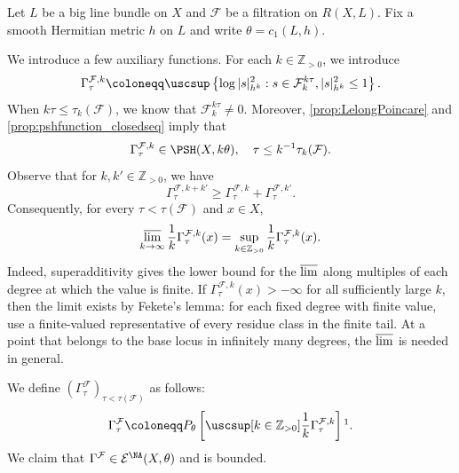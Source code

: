 \begin{example}\label{ex:RWN}
    Let $L$ be a big line bundle on $X$ and $\mathcal{F}$ be a filtration on $R(X,L)$. Fix a smooth Hermitian metric $h$ on $L$ and write $\theta=c_1(L,h)$.

    We introduce a few auxiliary functions. For each $k\in \mathbb{Z}_{>0}$, we introduce
    \[
    \Gamma^{\mathcal{F},k}_{\tau}\coloneqq \uscsup \left\{ \log |s|_{h^k}^2: s\in \mathcal{F}^{k\tau}_k, |s|_{h^k}^2\leq 1 \right\}.
    \]
    When $k\tau\leq \tau_k(\mathcal{F})$, we know that $\mathcal{F}_k^{k\tau}\neq 0$. Moreover, \cref{prop:LelongPoincare} and \cref{prop:pshfunction_closedseq} imply that
    \[
    \Gamma^{\mathcal{F},k}_{\tau}\in \PSH(X,k\theta),\quad \tau\leq k^{-1}\tau_k(\mathcal{F}).
    \]
    Observe that for $k,k'\in \mathbb{Z}_{>0}$, we have
    \[
    \Gamma^{\mathcal{F},k+k'}_{\tau}\geq \Gamma^{\mathcal{F},k}_{\tau}+\Gamma^{\mathcal{F},k'}_{\tau}.
    \]
    Consequently, for every $\tau<\tau(\mathcal F)$ and $x\in X$,
    \begin{equation}\label{eq:limkGammaFk}
    \varlimsup_{k\to\infty}\frac{1}{k}\Gamma^{\mathcal{F},k}_{\tau}(x)=\sup_{k\in \mathbb{Z}_{>0}}\frac{1}{k}\Gamma^{\mathcal{F},k}_{\tau}(x).
    \end{equation}
    Indeed, superadditivity gives the lower bound for the $\varlimsup$ along multiples of each degree at which the value is finite. If $\Gamma^{\mathcal{F},k}_{\tau}(x)>-\infty$ for all sufficiently large $k$, then the limit exists by Fekete's lemma: for each fixed degree with finite value, use a finite-valued representative of every residue class in the finite tail. At a point that belongs to the base locus in infinitely many degrees, the $\varlimsup$ is needed in general.

    We define $(\Gamma^{\mathcal{F}}_{\tau})_{\tau<\tau(\mathcal{F})}$ as follows:
    \[
    \Gamma^{\mathcal{F}}_{\tau}\coloneqq P_{\theta}\left[ \uscsup[k\in \mathbb{Z}_{>0}] \frac{1}{k} \Gamma^{\mathcal{F},k}_{\tau}\right]\footnotemark.
    \]
    We claim that $\Gamma^{\mathcal{F}}\in \mathcal{E}^{\NA}(X,\theta)$ and is bounded.


\end{example}
